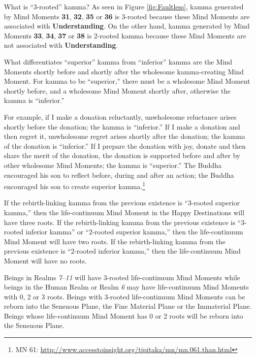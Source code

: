 What is “3-rooted” kamma? As seen in Figure \ref{fig:Faultless}, kamma generated by Mind Moments \textbf{31}, \textbf{32}, \textbf{35} or \textbf{36} is 3-rooted because these Mind Moments are associated with \textbf{Understanding}. On the other hand, kamma generated by Mind Moments \textbf{33}, \textbf{34}, \textbf{37} or \textbf{38} is 2-rooted kamma because these Mind Moments are not associated with \textbf{Understanding}.

What differentiates “superior” kamma from “inferior” kamma are the Mind Moments shortly before and shortly after the wholesome kamma-creating Mind Moment. For kamma to be “superior,” there must be a wholesome Mind Moment shortly before, and a wholesome Mind Moment shortly after, otherwise the kamma is “inferior.” 

\pagebreak

For example, if I make a donation reluctantly, unwholesome reluctance arises shortly before the donation; the kamma is “inferior.” If I make a donation and then regret it, unwholesome regret arises shortly after the donation; the kamma of the donation is “inferior.” If I prepare the donation with joy, donate and then share the merit of the donation, the donation is supported before and after by other wholesome Mind Moments; the kamma is “superior.” The Buddha encouraged his son to reflect before, during and after an action; the Buddha encouraged his son to create superior kamma.\footnote{MN 61: \url{http://www.accesstoinsight.org/tipitaka/mn/mn.061.than.html}}

If the rebirth-linking kamma from the previous existence is “3-rooted superior kamma,” then the life-continuum Mind Moment in the Happy Destinations will have three roots. If the rebirth-linking kamma from the previous existence is “3-rooted inferior kamma” or “2-rooted superior kamma,” then the life-continuum Mind Moment will have two roots. If the rebirth-linking kamma from the previous existence is “2-rooted inferior kamma,” then the life-continuum Mind Moment will have no roots.

Beings in Realms \textit{7}--\textit{11} will have 3-rooted life-continuum Mind Moments while beings in the Human Realm or Realm \textit{6} may have life-continuum Mind Moments with 0, 2 or 3 roots. Beings with 3-rooted life-continuum Mind Moments can be reborn into the Sensuous Plane, the Fine Material Plane or the Immaterial Plane. Beings whose life-continuum Mind Moment has 0 or 2 roots will be reborn into the Sensuous Plane.

